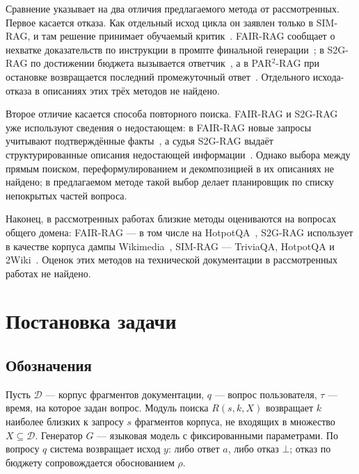 \documentclass{misisarticle}
\begin{document}
Сравнение указывает на два отличия предлагаемого метода от рассмотренных.
Первое касается отказа.
Как отдельный исход цикла он заявлен только в SIM-RAG, и там решение принимает обучаемый критик~\cite{yang2025knowing}. %
FAIR-RAG сообщает о нехватке доказательств по инструкции в промпте финальной генерации~\cite{asl2025fairrag}; %
в S2G-RAG по достижении бюджета вызывается ответчик~\cite{li2026s2grag}, %
а в PAR$^2$-RAG при остановке возвращается последний промежуточный ответ~\cite{li2026par2}. %
Отдельного исхода-отказа в описаниях этих трёх методов не найдено.

Второе отличие касается способа повторного поиска.
FAIR-RAG и S2G-RAG уже используют сведения о недостающем: в FAIR-RAG новые запросы учитывают подтверждённые факты~\cite{asl2025fairrag}, %
а судья S2G-RAG выдаёт структурированные описания недостающей информации~\cite{li2026s2grag}. %
Однако выбора между прямым поиском, переформулированием и декомпозицией в их описаниях не найдено; в предлагаемом методе такой выбор делает планировщик по списку непокрытых частей вопроса.

Наконец, в рассмотренных работах близкие методы оцениваются на вопросах общего домена: FAIR-RAG --- в том числе на HotpotQA~\cite{asl2025fairrag}, %
S2G-RAG использует в качестве корпуса дампы Wikimedia~\cite{li2026s2grag}, %
SIM-RAG --- TriviaQA, HotpotQA и 2Wiki~\cite{yang2025knowing}. %
Оценок этих методов на технической документации в рассмотренных работах не найдено.

\section{Постановка задачи}\label{sec:problem}

\subsection{Обозначения}

Пусть $\mathcal{D}$ --- корпус фрагментов документации, $q$ --- вопрос пользователя, $\tau$ --- время, на которое задан вопрос.
Модуль поиска $R(s, k, X)$ возвращает $k$ наиболее близких к запросу $s$ фрагментов корпуса, не входящих в множество $X \subseteq \mathcal{D}$.
Генератор $G$ --- языковая модель с фиксированными параметрами.
По вопросу $q$ система возвращает исход $y$: либо ответ $a$, либо отказ $\bot$; отказ по бюджету сопровождается обоснованием $\rho$.
\end{document}
